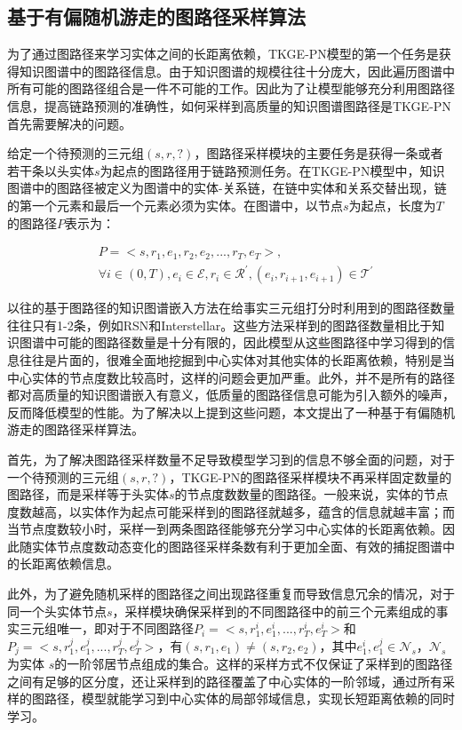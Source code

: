 \subsection{基于有偏随机游走的图路径采样算法}

为了通过图路径来学习实体之间的长距离依赖，TKGE-PN模型的第一个任务是获得知识图谱中的图路径信息。由于知识图谱的规模往往十分庞大，因此遍历图谱中所有可能的图路径组合是一件不可能的工作。因此为了让模型能够充分利用图路径信息，提高链路预测的准确性，如何采样到高质量的知识图谱图路径是TKGE-PN首先需要解决的问题。

给定一个待预测的三元组$(s,r,?)$，图路径采样模块的主要任务是获得一条或者若干条以头实体$s$为起点的图路径用于链路预测任务。在TKGE-PN模型中，知识图谱中的图路径被定义为图谱中的实体-关系链，在链中实体和关系交替出现，链的第一个元素和最后一个元素必须为实体。在图谱中，以节点$s$为起点，长度为$T$的图路径$P$表示为：

\begin{equation}
  \begin{aligned}
     &P=<s,r_1,e_1,r_2,e_2,...,r_T,e_T>, \\
     &{\forall}i \in (0,T),e_i\in\mathcal{E},r_i\in\mathcal{R}^{\prime},(e_i,r_{i+1},e_{i+1})\in\mathcal{T}^{\prime}
  \end{aligned}
\end{equation}

以往的基于图路径的知识图谱嵌入方法在给事实三元组打分时利用到的图路径数量往往只有1-2条，例如RSN和Interstellar。这些方法采样到的图路径数量相比于知识图谱中可能的图路径数量是十分有限的，因此模型从这些图路径中学习得到的信息往往是片面的，很难全面地挖掘到中心实体对其他实体的长距离依赖，特别是当中心实体的节点度数比较高时，这样的问题会更加严重。此外，并不是所有的路径都对高质量的知识图谱嵌入有意义，低质量的图路径信息可能为引入额外的噪声，反而降低模型的性能。为了解决以上提到这些问题，本文提出了一种基于有偏随机游走的图路径采样算法。

首先，为了解决图路径采样数量不足导致模型学习到的信息不够全面的问题，对于一个待预测的三元组$(s,r,?)$，TKGE-PN的图路径采样模块不再采样固定数量的图路径，而是采样等于头实体$s$的节点度数数量的图路径。一般来说，实体的节点度数越高，以实体作为起点可能采样到的图路径就越多，蕴含的信息就越丰富；而当节点度数较小时，采样一到两条图路径能够充分学习中心实体的长距离依赖。因此随实体节点度数动态变化的图路径采样条数有利于更加全面、有效的捕捉图谱中的长距离依赖信息。

此外，为了避免随机采样的图路径之间出现路径重复而导致信息冗余的情况，对于同一个头实体节点$s$，采样模块确保采样到的不同图路径中的前三个元素组成的事实三元组唯一，即对于不同图路径$P_i=<s,r_1^{i},e_1^{i},...,r_T^{i},e_T^{i}>$和$P_j=<s,r_1^{j},e_1^{j},...,r_T^{j},e_T^{j}>$，有$(s, r_1, e_1)\neq(s, r_2, e_2)$，其中$e_1^{i},e_1^{j}\in \mathcal{N}_s$，$\mathcal{N}_s$为实体 $s$的一阶邻居节点组成的集合。这样的采样方式不仅保证了采样到的图路径之间有足够的区分度，还让采样到的路径覆盖了中心实体的一阶邻域，通过所有采样的图路径，模型就能学习到中心实体的局部邻域信息，实现长短距离依赖的同时学习。

